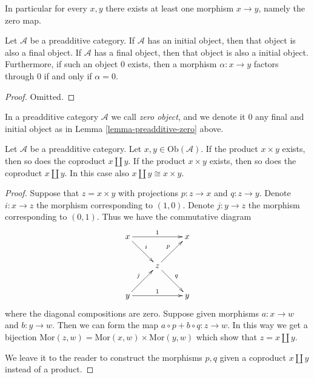 \noindent
In particular for every $x, y$ there exists at least
one morphism $x \to y$, namely the zero map.

\begin{lemma}
\label{lemma-preadditive-zero}
Let $\mathcal{A}$ be a preadditive category.
If $\mathcal{A}$ has an initial object, then that object
is also a final object. If $\mathcal{A}$ has a final object, then that object
is also a initial object. Furthermore, if such an object $0$ exists,
then a morphism $\alpha : x \to y$ factors through $0$ if and only if
$\alpha = 0$.
\end{lemma}

\begin{proof}
Omitted.
\end{proof}

\begin{definition}
\label{definition-zero-object}
In a preadditive category $\mathcal{A}$ we call
{\it zero object}, and we denote it $0$
any final and initial object as in Lemma \ref{lemma-preadditive-zero} above.
\end{definition}

\begin{lemma}
\label{lemma-preadditive-direct-sum}
Let $\mathcal{A}$ be a preadditive category.
Let $x, y \in \text{Ob}(\mathcal{A})$.
If the product $x \times y$ exists, then so does
the coproduct $x \coprod y$.
If the product $x \times y$ exists, then so does
the coproduct $x \coprod y$. In this case
also $x \coprod y \cong x \times y$.
\end{lemma}

\begin{proof}
Suppose that $z = x \times y$ with projections
$p : z \to x$ and $q : z \to y$. Denote $i : x \to z$
the morphism corresponding to $(1, 0)$. Denote $j : y \to z$
the morphism corresponding to $(0, 1)$. Thus we have the
commutative diagram
$$
\xymatrix{
x \ar[rr]^1 \ar[rd]^i & & x \\
& z \ar[ru]^p \ar[rd]^q & \\
y \ar[rr]^1 \ar[ru]^j & & y
}
$$
where the diagonal compositions are zero.
Suppose given morphisms $a : x \to w$ and $b : y \to w$.
Then we can form the map $a \circ p + b \circ q : z \to w$.
In this way we get a bijection $\text{Mor}(z, w)
= \text{Mor}(x, w) \times \text{Mor}(y, w)$ which
show that $z = x \coprod y$.

\medskip\noindent
We leave it to the reader to construct the morphisms
$p,q$ given a coproduct $x \coprod y$ instead of a
product.
\end{proof}

